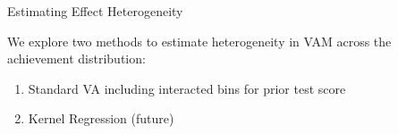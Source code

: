 \documentclass[11pt]{beamer}
\begin{document}

\begin{frame}{Estimating Effect Heterogeneity}

    We explore two methods to estimate heterogeneity in VAM across the achievement distribution:
    
    \begin{enumerate}
        \item Standard VA including interacted bins for prior test score
        \item Kernel Regression (future)
    \end{enumerate}
    
\end{frame}





        

    
    





\end{document}
